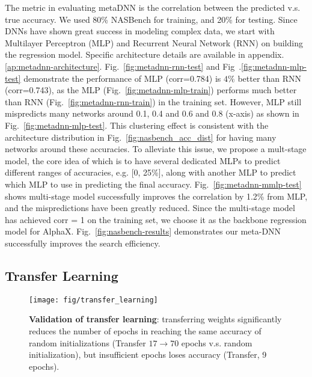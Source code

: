 \documentclass[10pt,twocolumn,letterpaper]{article}
\begin{document}
The metric in evaluating metaDNN is the correlation between the predicted v.s. true accuracy. We used 80\% NASBench for training, and 20\% for testing. Since DNNs have shown great success in modeling complex data, we start with Multilayer Perceptron (MLP) and Recurrent Neural Network (RNN) on building the regression model. Specific architecture details are available in appendix.\ref{ap:metadnn-architecture}.
Fig.~\ref{fig:metadnn-rnn-test} and Fig~.\ref{fig:metadnn-mlp-test} demonstrate the performance of MLP (corr=0.784) is $4\%$ better than RNN (corr=0.743), as the MLP (Fig.~\ref{fig:metadnn-mlp-train}) performs much better than RNN (Fig.~\ref{fig:metadnn-rnn-train}) in the training set. However, MLP still mispredicts many networks around 0.1, 0.4 and 0.6 and 0.8 (x-axis) as shown in Fig.~\ref{fig:metadnn-mlp-test}. This clustering effect is consistent with the architecture distribution in Fig.~\ref{fig:nasbench_acc_dist} for having many networks around these accuracies. To alleviate this issue, we propose a mult-stage model, the core idea of which is to have several dedicated MLPs to predict different ranges of accuracies, e.g. [0, 25\%], along with another MLP to predict which MLP to use in predicting the final accuracy.
Fig.~\ref{fig:metadnn-mmlp-test} shows multi-stage model successfully improves the correlation by 1.2\% from MLP, and the mispredictions have been greatly reduced. Since the multi-stage model has achieved corr = 1 on the training set, we choose it as the backbone regression model for AlphaX. Fig.~\ref{fig:nasbench-results} demonstrates our meta-DNN successfully improves the search efficiency.

\subsection{Transfer Learning}
\begin{figure}
  \begin{center}
    \texttt{[image: fig/transfer\_learning]}
  \end{center}
  \caption{\textbf{Validation of transfer learning}: transferring weights significantly reduces the number of epochs in reaching the same accuracy of random initializations (Transfer $17\rightarrow70$ epochs v.s. random initialization), but insufficient epochs loses accuracy (Transfer, 9 epochs).}
  \label{fig:transfer_learning}
\end{figure}
\end{document}
